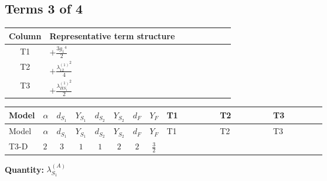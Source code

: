\documentclass[8pt]{article}
\begin{document}
\begin{landscape}
\subsection*{Terms 3 of 4}
\begin{center}
\begin{tabular}{@{}c >{\raggedright\arraybackslash}p{0.82\linewidth}@{}}
\toprule
Column & Representative term structure \\
\midrule
T1 & \(\displaystyle +\frac{3 {g_1}^4}{2}\) \\
\midrule
T2 & \(\displaystyle +\frac{{\lambda_{12}^{(1)}}^2}{4}\) \\
\midrule
T3 & \(\displaystyle +\frac{{\lambda_{HS_1}^{(1)}}^2}{2}\) \\
\midrule
\bottomrule
\end{tabular}
\end{center}
\smallskip
\tiny
\begin{longtable}{@{}llcccccc >{\raggedright\arraybackslash}p{0.21\linewidth} >{\raggedright\arraybackslash}p{0.21\linewidth} >{\raggedright\arraybackslash}p{0.21\linewidth}@{}}
\toprule
Model & $\alpha$ & $d_{S_1}$ & $Y_{S_1}$ & $d_{S_2}$ & $Y_{S_2}$ & $d_F$ & $Y_F$ & T1 & T2 & T3 \\
\midrule
\endfirsthead
\toprule
Model & $\alpha$ & $d_{S_1}$ & $Y_{S_1}$ & $d_{S_2}$ & $Y_{S_2}$ & $d_F$ & $Y_F$ & T1 & T2 & T3 \\
\midrule
\endhead
T3-D & $2$ & $3$ & $1$ & $1$ & $2$ & $2$ & $\frac{3}{2}$ & \scriptsize\adjustbox{max width=\linewidth}{$\begin{gathered} +\frac{3 {g_1}^4}{2}\end{gathered}$} & \scriptsize\adjustbox{max width=\linewidth}{$\begin{gathered} +\frac{{\lambda_{12}^{(1)}}^2}{4}\end{gathered}$} & \scriptsize\adjustbox{max width=\linewidth}{$\begin{gathered} +\frac{{\lambda_{HS_1}^{(1)}}^2}{2}\end{gathered}$} \\
\midrule
\bottomrule
\end{longtable}
\clearpage
\noindent\textbf{Quantity: }$\lambda_{S_1}^{(A)}$\par\smallskip

\end{landscape}
\end{document}
